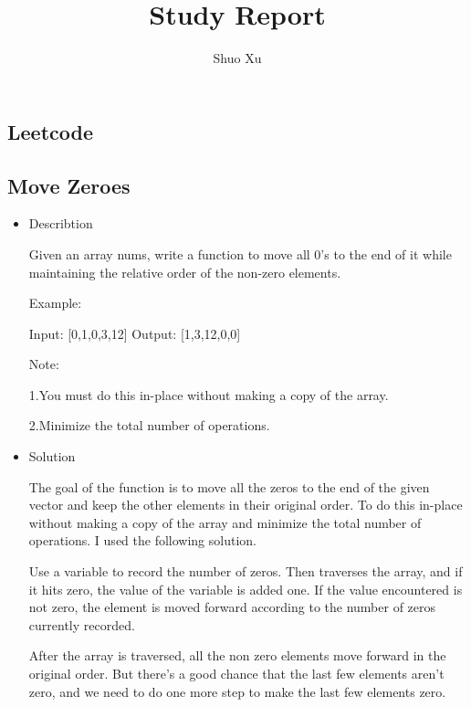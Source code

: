 \documentclass[UTF8]{ctexart}
\begin{document}
    \title{Study Report}
    \author{Shuo Xu}
    \maketitle


    \begin{center}
        \section*{Leetcode}
    \end{center}
    \subsection*{Move Zeroes}
    \begin{itemize}
        \item Describtion
        \begin{flushleft}
            Given an array nums, write a function to move all 0's to the end of it while maintaining the relative order of the non-zero elements.

            Example:

            Input: [0,1,0,3,12]
            Output: [1,3,12,0,0]

            Note:

            1.You must do this in-place without making a copy of the array.
            
            2.Minimize the total number of operations.

        \end{flushleft}

        \item Solution
        \begin{flushleft}
            The goal of the function is to move all the zeros to the end of the given vector and keep the other elements in their original order. To do this in-place without making a copy of the array and minimize the total number of operations. I used the following solution. 

            Use a variable to record the number of zeros. Then traverses the array, and if it hits zero, the value of the variable is added one. If the value encountered is not zero, the element is moved forward according to the number of zeros currently recorded.

            After the array is traversed, all the non zero elements move forward in the original order. But there's a good chance that the last few elements aren't zero, and we need to do one more step to make the last few elements zero.
        \end{flushleft}


\end{itemize}
\end{document}
